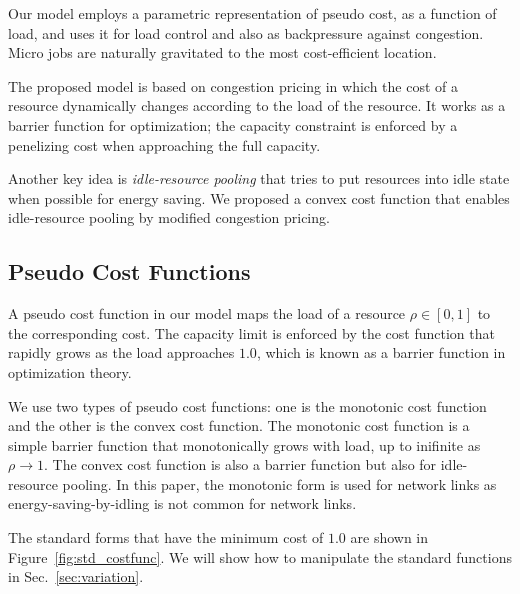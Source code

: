 

Our model employs a parametric representation of pseudo cost, as a
function of load, and uses it for load control and also as
backpressure against congestion.
Micro jobs are naturally gravitated to the most cost-efficient
location.

The proposed model is based on congestion pricing in which the cost of
a resource dynamically changes according to the load of the resource.
It works as a barrier function for optimization; the capacity
constraint is enforced by a penelizing cost when approaching the full
capacity.

Another key idea is {\em idle-resource pooling} that tries to put resources
into idle state when possible for energy saving.
We proposed a convex cost function that enables idle-resource pooling
by modified congestion pricing.

\subsection{Pseudo Cost Functions}

A pseudo cost function in our model maps the load of a resource
$\rho \in [0, 1]$ to the corresponding cost.
The capacity limit is enforced by the cost function that rapidly grows
as the load approaches $1.0$, which is known as a barrier function in
optimization theory. 

We use two types of pseudo cost functions: one is the monotonic cost
function and the other is the convex cost function.
The monotonic cost function is a simple barrier function that
monotonically grows with load, up to inifinite as $\rho \to 1$.
The convex cost function is also a barrier function but also for
idle-resource pooling.
In this paper, the monotonic form is used for network links as
energy-saving-by-idling is not common for network links.

The standard forms that have the minimum cost of $1.0$ are
shown in Figure~\ref{fig:std_costfunc}. We will show how to manipulate
the standard functions in Sec.~\ref{sec:variation}.

